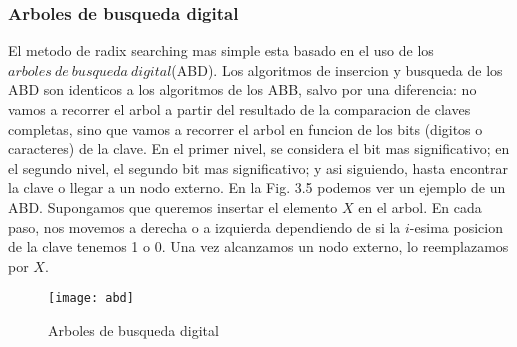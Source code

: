 \documentclass[10pt,a4paper]{article}
\begin{document}
\subsubsection{Arboles de busqueda digital}

El metodo de radix searching mas simple esta basado en el uso de los $arboles~de~busqueda~digital$(ABD). Los algoritmos de insercion y busqueda de los ABD son identicos a los algoritmos de los ABB, salvo por una diferencia: no vamos a recorrer el arbol a partir del resultado de la comparacion de claves completas, sino que vamos a recorrer el arbol en funcion de los bits (digitos o caracteres) de la clave. En el primer nivel, se considera el bit mas significativo; en el segundo nivel, el segundo bit mas significativo; y asi siguiendo, hasta encontrar la clave o llegar a un nodo externo.
\newline
\newline
En la Fig. 3.5 podemos ver un ejemplo de un ABD. Supongamos que queremos insertar el elemento $X$ en el arbol. En cada paso, nos movemos a derecha o a izquierda dependiendo de si la $i$-esima posicion de la clave tenemos 1 o 0. Una vez alcanzamos un nodo externo, lo reemplazamos por $X$.

\begin{figure}[h]
\centering
\texttt{[image: abd]}
\caption{Arboles de busqueda digital}
\label{drivers1}
\end{figure}

\newpage
\end{document}

